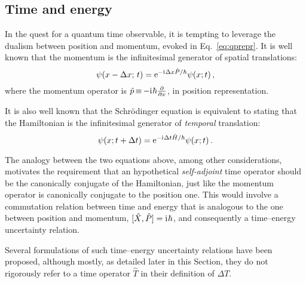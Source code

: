 \subsection{Time and energy}\label{sec:T--H}

In the quest for a quantum time observable,
it is tempting to leverage
the dualism between position and momentum,
evoked in Eq.~\eqref{eq:qprepr}.
It is well known that the momentum is the infinitesimal generator of spatial translations:
\begin{equation}\label{eq:genspacetransl}
  \psi(x-\Delta x; \, t) = \mathrm{e}^{-\mathrm{i}\mkern1mu \Delta x \hat{P} / \hbar} \psi(x; t) \,\text{,}
\end{equation}
where the momentum operator is $\hat{p} \operatorname*{\equiv} -\mathrm{i}\mkern1mu\hbar \pdv{x}$, in position representation.

It is also well known that the Schr\"odinger equation is equivalent to
stating that the Hamiltonian is the infinitesimal generator of
\emph{temporal} translation:
\begin{equation}\label{eq:gentimetransl}
  \psi(x; t+\Delta t) = \mathrm{e}^{-\mathrm{i}\mkern1mu \Delta t \hat{H} / \hbar} \psi(x; t) \,\text{.}
\end{equation}

The analogy between the two equations above,
among other considerations,
motivates the requirement that
an hypothetical \emph{self-adjoint} time operator should be the canonically conjugate of the Hamiltonian,
just like the momentum operator is canonically conjugate to the position one.
This would involve
a commutation relation between time and energy that is analogous to
the one between position and momentum, $[\hat{X}, \hat{P}] = \mathrm{i}\mkern1mu \hbar$,
and consequently a time--energy uncertainty relation.

Several formulations of such time--energy uncertainty relations have been proposed,
although mostly, as detailed later in this Section, they do not rigorously refer to
a time operator $\hat{T}$ in their definition of $\Delta T$.

